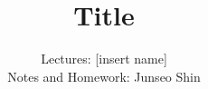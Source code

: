 \documentclass{article}
\author{Lectures: [insert name] \\ Notes and Homework: Junseo Shin}
\date{}
\title{Title}
\begin{document}
\maketitle
\tableofcontents
\pagebreak



% 

% 
\end{document}
